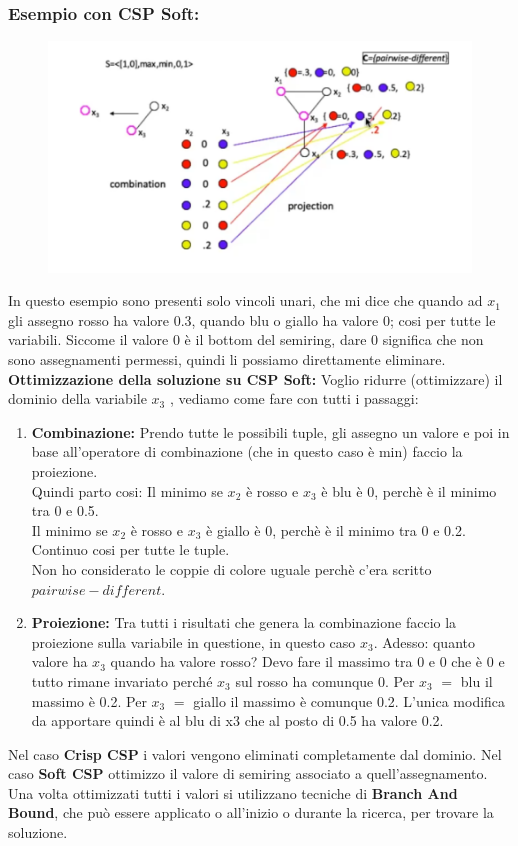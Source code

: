 \subsubsection{Esempio con CSP Soft:}
\begin{figure}[htp]
	\centering
    \includegraphics[width=14cm, keepaspectratio]{latex/img/Cap5/Local.png}
\end{figure}
\noindent In questo esempio sono presenti solo vincoli unari, che mi dice che quando ad $x_1$ gli assegno rosso ha valore 0.3, quando blu o giallo ha valore 0; cosi per tutte le variabili. Siccome il valore 0 è il bottom del semiring, dare 0 significa che non sono assegnamenti permessi, quindi li possiamo direttamente eliminare.\\
\textbf{Ottimizzazione della soluzione su CSP Soft: } Voglio ridurre (ottimizzare) il dominio della variabile $x_3$ , vediamo come fare con tutti i passaggi:
\begin{enumerate}
    \item \textbf{Combinazione:} Prendo tutte le possibili tuple, gli assegno un valore e poi in base all'operatore di combinazione (che in questo caso è min) faccio la proiezione.
    \\Quindi parto cosi:
    Il minimo se $x_2$ è rosso e $x_3$ è blu è 0, perchè è il minimo tra 0 e 0.5.
    \\Il minimo se $x_2$ è rosso e $x_3$ è giallo è 0, perchè è il minimo tra 0 e 0.2.
    \\Continuo cosi per tutte le tuple.
    \\Non ho considerato le coppie di colore uguale perchè c'era scritto $pairwise-different$.
    \item \textbf{Proiezione:} Tra tutti i risultati che genera la combinazione faccio la proiezione sulla variabile in questione, in questo caso $x_3$. Adesso: quanto valore ha $x_3$ quando ha valore rosso? Devo fare il massimo tra 0 e 0 che è 0 e tutto rimane invariato perché $x_3$ sul rosso ha comunque 0. Per $x_3$ $=$ blu il massimo è 0.2. Per $x_3$ $=$ giallo il massimo è comunque 0.2. L’unica modifica da apportare quindi è al blu di x3 che al posto di 0.5 ha valore 0.2.
\end{enumerate}
Nel caso \textbf{Crisp CSP} i valori vengono eliminati completamente dal dominio. Nel caso \textbf{Soft CSP} ottimizzo il valore di semiring associato a quell’assegnamento. Una volta ottimizzati tutti i valori si utilizzano tecniche di \textbf{Branch And Bound}, che può essere applicato o all’inizio o durante la ricerca, per trovare la soluzione.

